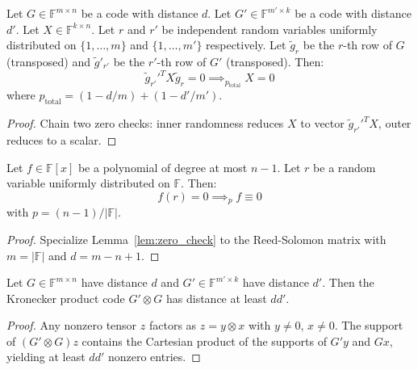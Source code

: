 \begin{lemma}\label{lem:reduced_matrix_zero_check}\leanok {}
Let $G \in \mathbb{F}^{m \times n}$ be a code with distance $d$. Let $G' \in \mathbb{F}^{m' \times k}$ be a code with distance $d'$.
Let $X \in \mathbb{F}^{k \times n}$.
Let $r$ and $r'$ be independent random variables uniformly distributed on $\{1, \ldots, m\}$ and $\{1, \ldots, m'\}$ respectively.
Let $\tilde{g}_r$ be the $r$-th row of $G$ (transposed) and $\tilde{g}'_{r'}$ be the $r'$-th row of $G'$ (transposed).
Then:
\[ \tilde{g}_{r'}'^{\!T} X \tilde{g}_r = 0 \implies_{p_{\text{total}}} X = 0 \]
where $p_{\text{total}} = (1 - d/m) + (1 - d'/m')$.
\end{lemma}
\begin{proof} \leanok
Chain two zero checks: inner randomness reduces $X$ to vector $\tilde{g}_{r'}'^{\!T} X$, outer reduces to a scalar.
\end{proof}

\begin{lemma}\label{lem:polynomial_zero_check}\leanok {}
Let $f \in \mathbb{F}[x]$ be a polynomial of degree at most $n-1$. Let $r$ be a random variable uniformly distributed on $\mathbb{F}$.
Then:
\[ f(r) = 0 \implies_{p} f \equiv 0 \]
with $p = (n-1)/|\mathbb{F}|$.
\end{lemma}
\begin{proof} \leanok
Specialize Lemma~\ref{lem:zero_check} to the Reed-Solomon matrix with $m = |\mathbb{F}|$ and $d = m-n+1$.
\end{proof}

\begin{lemma}\label{lem:kronecker_product_distance} \leanok {}
Let $G \in \mathbb{F}^{m \times n}$ have distance $d$ and $G' \in \mathbb{F}^{m' \times k}$ have distance $d'$.
Then the Kronecker product code $G' \otimes G$ has distance at least $dd'$.
\end{lemma}
\begin{proof} \leanok
Any nonzero tensor $z$ factors as $z = y \otimes x$ with $y \neq 0$, $x \neq 0$. The support of $(G' \otimes G)z$ contains the Cartesian product of the supports of $G'y$ and $Gx$, yielding at least $dd'$ nonzero entries.
\end{proof}

